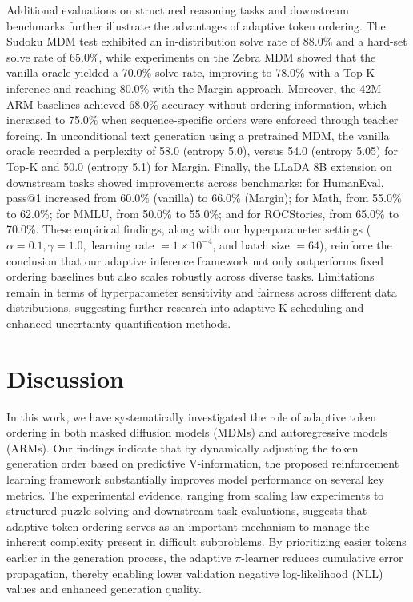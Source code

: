 \documentclass{article} %
\begin{document}
Additional evaluations on structured reasoning tasks and downstream benchmarks further illustrate the advantages of adaptive token ordering. The Sudoku MDM test exhibited an in-distribution solve rate of 88.0\% and a hard-set solve rate of 65.0\%, while experiments on the Zebra MDM showed that the vanilla oracle yielded a 70.0\% solve rate, improving to 78.0\% with a Top-K inference and reaching 80.0\% with the Margin approach. Moreover, the 42M ARM baselines achieved 68.0\% accuracy without ordering information, which increased to 75.0\% when sequence-specific orders were enforced through teacher forcing. In unconditional text generation using a pretrained MDM, the vanilla oracle recorded a perplexity of 58.0 (entropy 5.0), versus 54.0 (entropy 5.05) for Top-K and 50.0 (entropy 5.1) for Margin. Finally, the LLaDA 8B extension on downstream tasks showed improvements across benchmarks: for HumanEval, pass@1 increased from 60.0\% (vanilla) to 66.0\% (Margin); for Math, from 55.0\% to 62.0\%; for MMLU, from 50.0\% to 55.0\%; and for ROCStories, from 65.0\% to 70.0\%. These empirical findings, along with our hyperparameter settings (\( \alpha = 0.1, \gamma = 1.0, \) learning rate \( = 1\times10^{-4} \), and batch size \( = 64 \)), reinforce the conclusion that our adaptive inference framework not only outperforms fixed ordering baselines but also scales robustly across diverse tasks. Limitations remain in terms of hyperparameter sensitivity and fairness across different data distributions, suggesting further research into adaptive K scheduling and enhanced uncertainty quantification methods.

\section{Discussion}
In this work, we have systematically investigated the role of adaptive token ordering in both masked diffusion models (MDMs) and autoregressive models (ARMs). Our findings indicate that by dynamically adjusting the token generation order based on predictive V-information, the proposed reinforcement learning framework substantially improves model performance on several key metrics. The experimental evidence, ranging from scaling law experiments to structured puzzle solving and downstream task evaluations, suggests that adaptive token ordering serves as an important mechanism to manage the inherent complexity present in difficult subproblems. By prioritizing easier tokens earlier in the generation process, the adaptive $\pi$-learner reduces cumulative error propagation, thereby enabling lower validation negative log-likelihood (NLL) values and enhanced generation quality.
\end{document}
